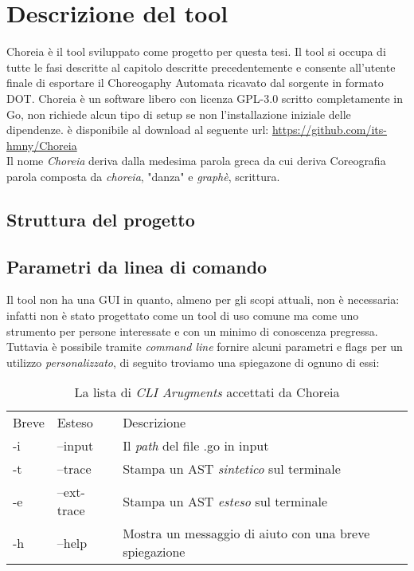 \chapter{Descrizione del tool}
Choreia è il tool sviluppato come progetto per questa tesi. Il tool si occupa di tutte le fasi descritte al capitolo descritte precedentemente e consente all'utente finale di esportare il Choreogaphy Automata ricavato dal sorgente in formato DOT.
Choreia è un software libero con licenza GPL-3.0 scritto completamente in Go, non richiede alcun tipo di setup se non l'installazione iniziale delle dipendenze. è disponibile al download al seguente url: \url{https://github.com/its-hmny/Choreia} \\
Il nome \emph{Choreia} deriva dalla medesima parola greca da cui deriva Coreografia parola composta da \emph{choreia}, "danza" e \emph{graphè}, scrittura.

\section{Struttura del progetto}

\section{Parametri da linea di comando}
Il tool non ha una GUI in quanto, almeno per gli scopi attuali, non è necessaria: infatti non è stato progettato come un tool di uso comune ma come uno strumento per persone interessate e con un minimo di conoscenza pregressa.\\
Tuttavia è possibile tramite \emph{command line} fornire alcuni parametri e flags per un utilizzo \emph{personalizzato}, di seguito troviamo una spiegazone di ognuno di essi:
\begin{table}[h!]
    \centering
    \begin{tabular}{l l l}
        Breve & Esteso      & Descrizione                                            \\
        -i    & --input     & Il \emph{path} del file .go in input                   \\
        -t    & --trace     & Stampa un AST \emph{sintetico} sul terminale           \\
        -e    & --ext-trace & Stampa un AST \emph{esteso} sul terminale              \\
        -h    & --help      & Mostra un messaggio di aiuto con una breve spiegazione \\
    \end{tabular}
    \caption{La lista di \emph{CLI Arugments} accettati da Choreia}
\end{table}

